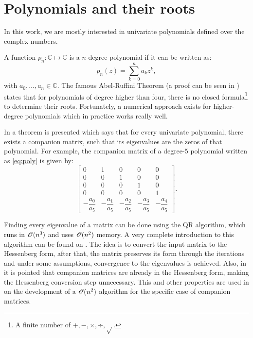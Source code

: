 \section{Polynomials and their roots}

In this work, we are mostly interested in univariate polynomials defined over the complex numbers.

A function $p_n: \mathbb{C} \mapsto \mathbb{C}$ is a $n$-degree polynomial if it can be written as:
\begin{equation}\label{eq:poly}
p_n(z) = \sum_{k=0}^{n} a_k z^k,
\end{equation}
with $a_0, \dots, a_n \in \mathbb{C}$.
The famous Abel-Ruffini Theorem (a proof can be seen in ) states that for polynomials of degree higher than four, there is no closed formula\footnote{A finite number of $+, -, \times, \div, \sqrt{}$.} to determine their roots. Fortunately, a numerical approach exists for higher-degree polynomials which in practice works really well.

 In  a theorem is presented which says that for every univariate polynomial, there exists a companion matrix, such that its eigenvalues are the zeros of that polynomial.  For example, the companion matrix of a degree-$5$ polynomial written as \autoref{eq:poly} is given by:
 \begin{equation}
 \left[\begin{array}{ccccc}
 0 & 1 & 0 & 0 & 0\\
 0 & 0 & 1 & 0 & 0\\
 0 & 0 & 0 & 1 & 0\\
 0 & 0 & 0 & 0 & 1\\
 -\dfrac{a_0}{a_5} & -\dfrac{a_1}{a_5} & -\dfrac{a_2}{a_5} & -\dfrac{a_3}{a_5} & -\dfrac{a_4}{a_5}
 \end{array}\right].
 \end{equation}
 
 Finding every eigenvalue of a matrix can be done using the QR algorithm, which runs in $\mathscr{O}(n^3)$ and uses $\mathscr{O}(n^2)$ memory. A very complete introduction to this algorithm can be found on . The idea is to convert the input matrix to the Hessenberg form, after that, the matrix preserves its form through the iterations and under some assumptions, convergence to the eigenvalues is achieved.
 Also, in  it is pointed that companion matrices are already in the Hessenberg form, making the Hessenberg conversion step unnecessary. This and other properties are used in  on the development of a $\mathscr{O}(n^2)$ algorithm for the specific case of companion matrices.
 
